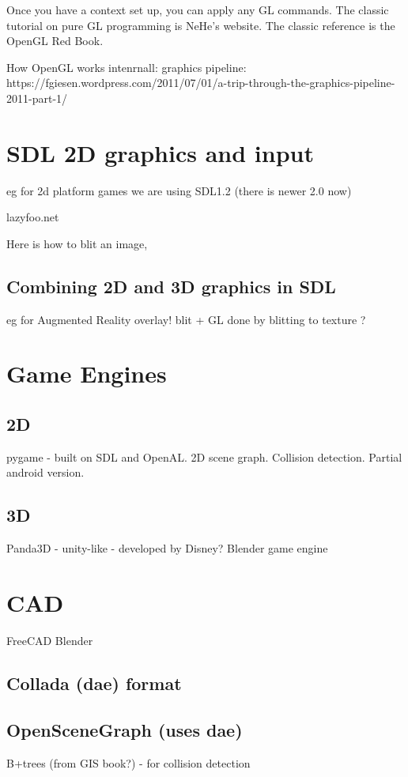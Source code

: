 \documentclass[oneside,english]{scrbook}
\begin{document}
Once you have a context set up, you can apply any GL commands. The classic tutorial on pure GL programming is NeHe's website.  The classic reference is the OpenGL Red Book.

How OpenGL works intenrnall: graphics pipeline: https://fgiesen.wordpress.com/2011/07/01/a-trip-through-the-graphics-pipeline-2011-part-1/

\chapter{SDL 2D graphics and input}
eg for 2d platform games
we are using SDL1.2 (there is newer 2.0 now)

lazyfoo.net

Here is how to blit an image,



\section{Combining 2D and 3D graphics in SDL}
eg for Augmented Reality overlay!
blit + GL
done by blitting to texture ?

\chapter{Game Engines}
\section{2D}
pygame - built on SDL and OpenAL.  2D scene graph. Collision detection. Partial android version.

\section{3D}
Panda3D - unity-like - developed by Disney?
Blender game engine

\chapter{CAD}
FreeCAD
Blender

\section{Collada (dae) format}


\section{OpenSceneGraph (uses dae)}
B+trees (from GIS book?) - for collision detection
\end{document}

